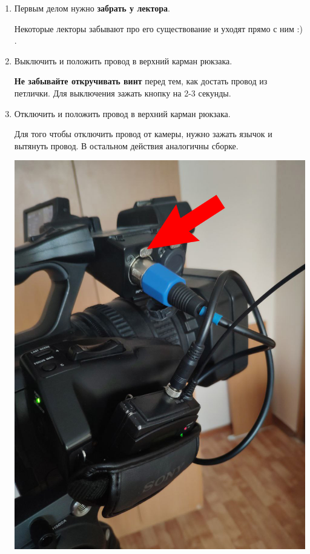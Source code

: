 \begin{enumerate}
  \item Первым делом нужно \textbf{забрать  у лектора}.
        \par Некоторые лекторы забывают про его существование и уходят прямо с ним :) .

  \item Выключить  и положить провод в верхний карман рюкзака.
        \par \textbf{Не забывайте откручивать винт} перед тем, как достать провод из петлички. Для выключения зажать кнопку  на 2-3 секунды.

  \item Отключить  и положить провод в верхний карман рюкзака.
        \par Для того чтобы отключить провод от камеры, нужно зажать язычок  и вытянуть провод. В остальном действия аналогичны сборке.

        \begin{center}
          \begin{minipage}[c]{0.45\textwidth}
            \includegraphics[width=\textwidth]{Images/PortableCamera/recording/pull-out-xlr.jpg}
          \end{minipage}
        \end{center}


\end{enumerate}
